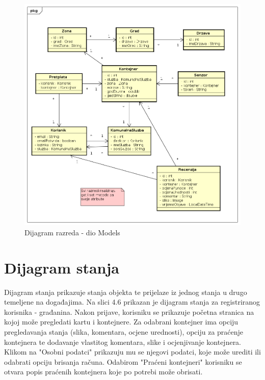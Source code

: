 			\begin{figure}[H]
				\includegraphics[width=1.0\linewidth]{slike/dijagramRazredaModels.png}
				\centering
				\caption{Dijagram razreda - dio Models}
				\label{fig:dijagramRazredaModels}
			\end{figure}
		
%			
			
			
			
			\eject
		
		\section{Dijagram stanja}
			
			
			Dijagram stanja prikazuje stanja objekta te prijelaze iz jednog stanja u drugo temeljene na događajima. Na slici 4.6 prikazan je dijagram stanja za registriranog korisnika - građanina. Nakon prijave, korisniku se prikazuje početna stranica na kojoj može pregledati kartu i kontejnere. Za odabrani kontejner ima opciju pregledavanja stanja (slika, komentara, ocjene urednosti), opciju za praćenje kontejnera te dodavanje vlastitog komentara, slike i ocjenjivanje kontejnera. Klikom na "Osobni podatci" prikazuju mu se njegovi podatci, koje može urediti ili odabrati opciju brisanja računa. Odabirom "Praćeni kontejneri" korisniku se otvara popis praćenih kontejnera koje po potrebi može obrisati.
			
